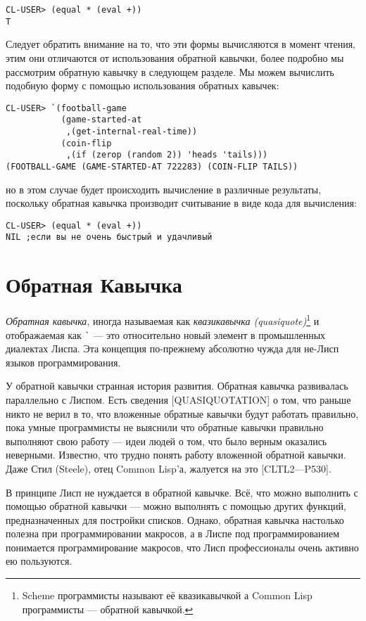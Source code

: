\begin{verbatim}
CL-USER> (equal * (eval +))
T
\end{verbatim}

Следует обратить внимание на то, что эти формы вычисляются в момент чтения, этим они отличаются от использования обратной кавычки, более подробно мы рассмотрим обратную кавычку в следующем разделе. Мы можем вычислить подобную форму с помощью использования обратных кавычек:

\begin{verbatim}
CL-USER> `(football-game
           (game-started-at
            ,(get-internal-real-time))
           (coin-flip
            ,(if (zerop (random 2)) 'heads 'tails)))
(FOOTBALL-GAME (GAME-STARTED-AT 722283) (COIN-FLIP TAILS))
\end{verbatim}

но в этом случае будет происходить вычисление в различные результаты, поскольку обратная кавычка производит считывание в виде кода для вычисления:

\begin{verbatim}
CL-USER> (equal * (eval +))
NIL ;если вы не очень быстрый и удачливый
\end{verbatim}

\section{Обратная Кавычка}\label{section_backquote}

\emph{Обратная кавычка}\index{}, иногда называемая как \emph{квазикавычка (quasiquote)}\footnote{Scheme программисты называют её квазикавычкой а Common Lisp программисты --- обратной кавычкой.} и отображаемая как \verb"`" --- это относительно новый элемент в промышленных диалектах Лиспа. Эта концепция по-прежнему абсолютно чужда для не-Лисп языков программирования.

У обратной кавычки странная история развития. Обратная кавычка развивалась параллельно с Лиспом. Есть сведения [QUASIQUOTATION] о том, что раньше никто не верил в то, что вложенные обратные кавычки будут работать правильно, пока умные программисты не выяснили что обратные кавычки правильно выполняют свою работу --- идеи людей о том, что было верным оказались неверными. Известно, что трудно понять работу вложенной обратной кавычки. Даже Стил (Steele), отец Common Lisp'а, жалуется на это [CLTL2—P530].

В принципе Лисп не нуждается в обратной кавычке. Всё, что можно выполнить с помощью обратной кавычки --- можно выполнять с помощью других функций, предназначенных для постройки списков. Однако, обратная кавычка настолько полезна при программировании макросов, а в Лиспе под программированием понимается программирование макросов, что Лисп профессионалы очень активно ею пользуются.

